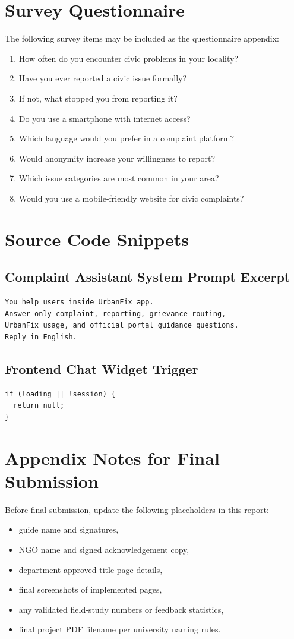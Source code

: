 \documentclass[12pt,a4paper]{report}
\begin{document}
\chapter{Survey Questionnaire}
The following survey items may be included as the questionnaire appendix:
\begin{enumerate}
  \item How often do you encounter civic problems in your locality?
  \item Have you ever reported a civic issue formally?
  \item If not, what stopped you from reporting it?
  \item Do you use a smartphone with internet access?
  \item Which language would you prefer in a complaint platform?
  \item Would anonymity increase your willingness to report?
  \item Which issue categories are most common in your area?
  \item Would you use a mobile-friendly website for civic complaints?
\end{enumerate}

\chapter{Source Code Snippets}
\section*{Complaint Assistant System Prompt Excerpt}
\begin{lstlisting}
You help users inside UrbanFix app.
Answer only complaint, reporting, grievance routing,
UrbanFix usage, and official portal guidance questions.
Reply in English.
\end{lstlisting}

\section*{Frontend Chat Widget Trigger}
\begin{lstlisting}
if (loading || !session) {
  return null;
}
\end{lstlisting}

\chapter{Appendix Notes for Final Submission}
Before final submission, update the following placeholders in this report:
\begin{itemize}
  \item guide name and signatures,
  \item NGO name and signed acknowledgement copy,
  \item department-approved title page details,
  \item final screenshots of implemented pages,
  \item any validated field-study numbers or feedback statistics,
  \item final project PDF filename per university naming rules.
\end{itemize}
\end{document}
